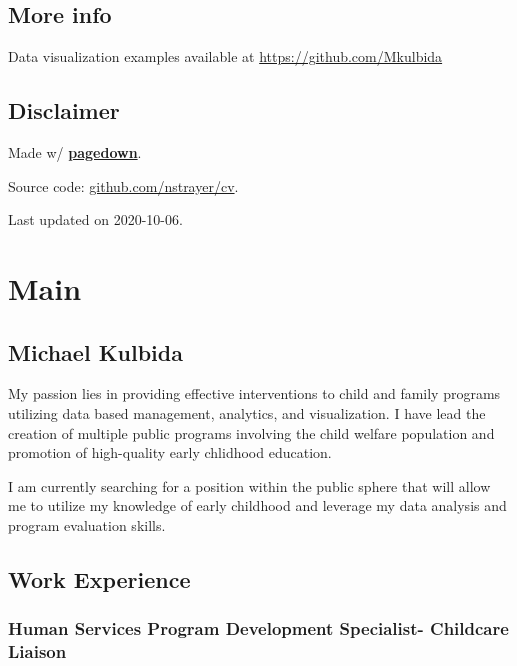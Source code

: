 \documentclass[
]{article}
\begin{document}
\hypertarget{more-info}{%
\subsection{More info}\label{more-info}}

Data visualization examples available at
\url{https://github.com/Mkulbida}

\hypertarget{disclaimer}{%
\subsection{Disclaimer}\label{disclaimer}}

Made w/ \href{https://github.com/rstudio/pagedown}{\textbf{pagedown}}.

Source code:
\href{https://github.com/nstrayer/cv}{github.com/nstrayer/cv}.

Last updated on 2020-10-06.

\hypertarget{main}{%
\section{Main}\label{main}}

\hypertarget{title}{%
\subsection{Michael Kulbida}\label{title}}

My passion lies in providing effective interventions to child and family
programs utilizing data based management, analytics, and visualization.
I have lead the creation of multiple public programs involving the child
welfare population and promotion of high-quality early chlidhood
education.

I am currently searching for a position within the public sphere that
will allow me to utilize my knowledge of early childhood and leverage my
data analysis and program evaluation skills.

\hypertarget{work-experience}{%
\subsection{Work Experience}\label{work-experience}}

\hypertarget{human-services-program-development-specialist--childcare-liaison}{%
\subsubsection{Human Services Program Development Specialist- Childcare
Liaison}\label{human-services-program-development-specialist--childcare-liaison}}
\end{document}

